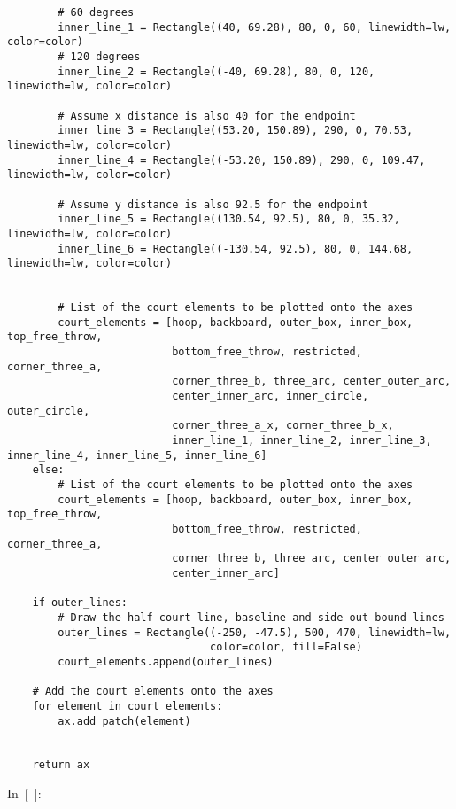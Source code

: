 \begin{verbatim}
        # 60 degrees
        inner_line_1 = Rectangle((40, 69.28), 80, 0, 60, linewidth=lw, color=color)
        # 120 degrees
        inner_line_2 = Rectangle((-40, 69.28), 80, 0, 120, linewidth=lw, color=color)
        
        # Assume x distance is also 40 for the endpoint
        inner_line_3 = Rectangle((53.20, 150.89), 290, 0, 70.53, linewidth=lw, color=color)
        inner_line_4 = Rectangle((-53.20, 150.89), 290, 0, 109.47, linewidth=lw, color=color)
        
        # Assume y distance is also 92.5 for the endpoint
        inner_line_5 = Rectangle((130.54, 92.5), 80, 0, 35.32, linewidth=lw, color=color)
        inner_line_6 = Rectangle((-130.54, 92.5), 80, 0, 144.68, linewidth=lw, color=color)
        
        
        # List of the court elements to be plotted onto the axes
        court_elements = [hoop, backboard, outer_box, inner_box, top_free_throw,
                          bottom_free_throw, restricted, corner_three_a,
                          corner_three_b, three_arc, center_outer_arc,
                          center_inner_arc, inner_circle, outer_circle,
                          corner_three_a_x, corner_three_b_x,
                          inner_line_1, inner_line_2, inner_line_3, inner_line_4, inner_line_5, inner_line_6]
    else:
        # List of the court elements to be plotted onto the axes
        court_elements = [hoop, backboard, outer_box, inner_box, top_free_throw,
                          bottom_free_throw, restricted, corner_three_a,
                          corner_three_b, three_arc, center_outer_arc,
                          center_inner_arc]
    
    if outer_lines:
        # Draw the half court line, baseline and side out bound lines
        outer_lines = Rectangle((-250, -47.5), 500, 470, linewidth=lw,
                                color=color, fill=False)
        court_elements.append(outer_lines)

    # Add the court elements onto the axes
    for element in court_elements:
        ax.add_patch(element)
        

    return ax
\end{verbatim}

In~{[}~{]}:

